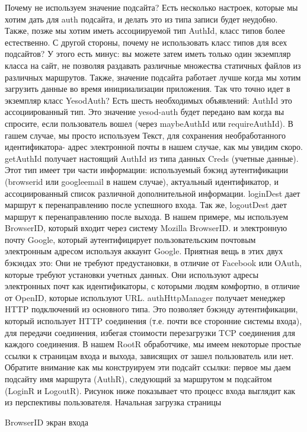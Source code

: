 Почему не используем значение подсайта? Есть несколько настроек, которые мы хотим дать для auth подсайта, и делать это из типа записи будет неудобно. Также, позже мы хотим иметь ассоциируемой тип AuthId, класс типов более естественно.
С другой стороны, почему не использовать класс типов для всех подсайтов? У этого есть минус: вы можете затем иметь только один экземпляр класса на сайт, не позволяя раздавать различные множества статичных файлов из различных маршрутов. Также, значение подсайта работает лучше когда мы хотим загрузить данные во время иницииализации приложения.
Так что точно идет в экземпляр класс YesodAuth? Есть шесть необходимых объявлений:
AuthId это ассоциированный тип. Это значение yesod-auth будет передано вам когда вы спросите, если пользователь вошел (через maybeAuthId или requireAuthId). В гашем случае, мы просто используем Текст, для сохранения необработанного идентификатора- адрес электронной почты в нашем случае, как мы увидим скоро. 
getAuthId получает настоящий AuthId из типа данных Creds (учетные данные). Этот тип имеет три части информации: используемый бэкэнд аутентификации (browserid или googleemail в нашем случае), актуальный идентификатор, и ассоциированный список различной дополнительной информации.
loginDest дает маршрут к перенаправлению после успешного входа.
Так же, logoutDest дает маршрут к перенаправлению после выхода. В нашем примере, мы используем BrowserID, который входит через систему  Mozilla BrowserID. и электронную почту Google, который аутентифицирует пользовательским почтовым электронным адресом используя аккаунт Google. Приятная вещь в этих двух бэкэндах это:
Они не требуют предустановки, в отличие от Facebook или OAuth, которые требуют установки учетных данных.
Они используют адресы электронных почт как идентификаторы, с которыми людям комфортно, в отличие от OpenID, которые используют URL. 
authHttpManager получает менеджер HTTP подключений из основного типа. Это позволяет бэкэнду аутентификации, который использует HTTP соединения (т.е. почти все сторонние системы входа), для передачи соединения, избегая стоимости перезагрузки TCP соединения для каждого соединения.
В нашем RootR обработчике, мы имеем некоторые простые ссылки к страницам входа и выхода, зависящих от зашел пользователь или нет. Обратите внимание как мы конструируем эти подсайт ссылки: первое мы даем подсайту имя маршрута (AuthR), следующий за маршрутом м подсайтом (LoginR и LogoutR).
Рисунок ниже показывает что процесс входа выглядит как из перспективы пользователя.
Начальная загрузка страницы


BrowserID экран входа


